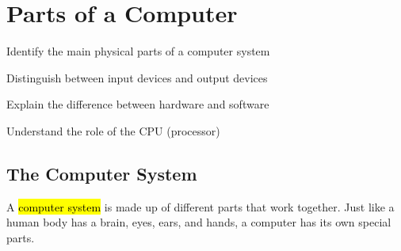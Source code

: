 
\chapter{Parts of a Computer}
\label{ch:parts}

\begin{objectives}
  \item Identify the main physical parts of a computer system
  \item Distinguish between input devices and output devices
  \item Explain the difference between hardware and software
  \item Understand the role of the CPU (processor)
\end{objectives}


\section{The Computer System}
\label{sec:computer-system}

A \hl{computer system} is made up of different parts that work together. Just like a human body has a brain, eyes, ears, and hands, a computer has its own special parts.

